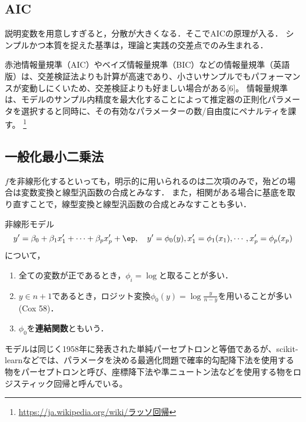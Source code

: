 \documentclass[uplatex,dvipdfmx]{jsreport}
\begin{document}
\subsection{AIC}

\begin{tcolorbox}[colframe=ForestGreen, colback=ForestGreen!10!white,breakable,colbacktitle=ForestGreen!40!white,coltitle=black,fonttitle=\bfseries\sffamily,
title=]
    説明変数を用意しすぎると，分散が大きくなる．そこでAICの原理が入る．
    シンプルかつ本質を捉えた基準は，理論と実践の交差点でのみ生まれる．
\end{tcolorbox}

\begin{remarks}
    赤池情報量規準（AIC）やベイズ情報量規準（BIC）などの情報量規準（英語版）は、交差検証法よりも計算が高速であり、小さいサンプルでもパフォーマンスが変動しにくいため、交差検証よりも好ましい場合がある[6]。 情報量規準は、モデルのサンプル内精度を最大化することによって推定器の正則化パラメータを選択すると同時に、その有効なパラメーターの数/自由度にペナルティを課す。 \footnote{\url{https://ja.wikipedia.org/wiki/ラッソ回帰}}
\end{remarks}

\subsection{一般化最小二乗法}

\begin{tcolorbox}[colframe=ForestGreen, colback=ForestGreen!10!white,breakable,colbacktitle=ForestGreen!40!white,coltitle=black,fonttitle=\bfseries\sffamily,
title=]
    $f$を非線形化するといっても，明示的に用いられるのは二次項のみで，殆どの場合は変数変換と線型汎函数の合成とみなす．
    また，相関がある場合に基底を取り直すことで，線型変換と線型汎函数の合成とみなすことも多い．
\end{tcolorbox}

\begin{example}
    非線形モデル
    \[y'=\beta_0+\beta_1x'_1+\cdots+\beta_px_p'+\ep,\quad y'=\phi_0(y),x_1'=\phi_1(x_1),\cdots,x_p'=\phi_p(x_p)\]
    について，
    \begin{enumerate}
        \item 全ての変数が正であるとき，$\phi_i=\log$と取ることが多い．
        \item $y\in n+1$であるとき，ロジット変換$\phi_0(y)=\log\frac{y}{n-y}$を用いることが多い(Cox 58)．
        \item $\phi_0$を\textbf{連結関数}ともいう．
    \end{enumerate}
\end{example}
\begin{remarks}
    モデルは同じく1958年に発表された単純パーセプトロンと等価であるが、scikit-learnなどでは、パラメータを決める最適化問題で確率的勾配降下法を使用する物をパーセプトロンと呼び、座標降下法や準ニュートン法などを使用する物をロジスティック回帰と呼んでいる。 
\end{remarks}
\end{document}
